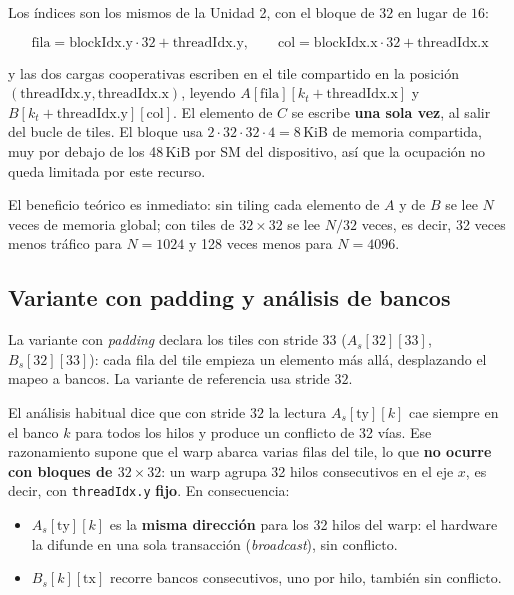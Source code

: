 	Los índices son los mismos de la Unidad 2, con el bloque de $32$ en lugar de $16$:

	\begin{equation}
		\text{fila} = \text{blockIdx.y}\cdot 32 + \text{threadIdx.y}, \qquad
		\text{col} = \text{blockIdx.x}\cdot 32 + \text{threadIdx.x}
		\label{eqn:indices}
	\end{equation}

	y las dos cargas cooperativas escriben en el tile compartido en la posición $(\text{threadIdx.y}, \text{threadIdx.x})$, leyendo $A[\text{fila}][k_t + \text{threadIdx.x}]$ y $B[k_t + \text{threadIdx.y}][\text{col}]$. El elemento de $C$ se escribe \textbf{una sola vez}, al salir del bucle de tiles. El bloque usa $2 \cdot 32 \cdot 32 \cdot 4 = 8$\,KiB de memoria compartida, muy por debajo de los 48\,KiB por SM del dispositivo, así que la ocupación no queda limitada por este recurso.

	El beneficio teórico es inmediato: sin tiling cada elemento de $A$ y de $B$ se lee $N$ veces de memoria global; con tiles de $32 \times 32$ se lee $N/32$ veces, es decir, 32 veces menos tráfico para $N = 1024$ y 128 veces menos para $N = 4096$.

\subsection{Variante con padding y análisis de bancos}

	La variante con \textit{padding} declara los tiles con stride $33$ ($A_s[32][33]$, $B_s[32][33]$): cada fila del tile empieza un elemento más allá, desplazando el mapeo a bancos. La variante de referencia usa stride $32$.

	El análisis habitual dice que con stride $32$ la lectura $A_s[\text{ty}][k]$ cae siempre en el banco $k$ para todos los hilos y produce un conflicto de 32 vías. Ese razonamiento supone que el warp abarca varias filas del tile, lo que \textbf{no ocurre con bloques de $32 \times 32$}: un warp agrupa 32 hilos consecutivos en el eje $x$, es decir, con \texttt{threadIdx.y} \textbf{fijo}. En consecuencia:

	\begin{itemize}
		\item $A_s[\text{ty}][k]$ es la \textbf{misma dirección} para los 32 hilos del warp: el hardware la difunde en una sola transacción (\textit{broadcast}), sin conflicto.
		\item $B_s[k][\text{tx}]$ recorre bancos consecutivos, uno por hilo, también sin conflicto.
	\end{itemize}

